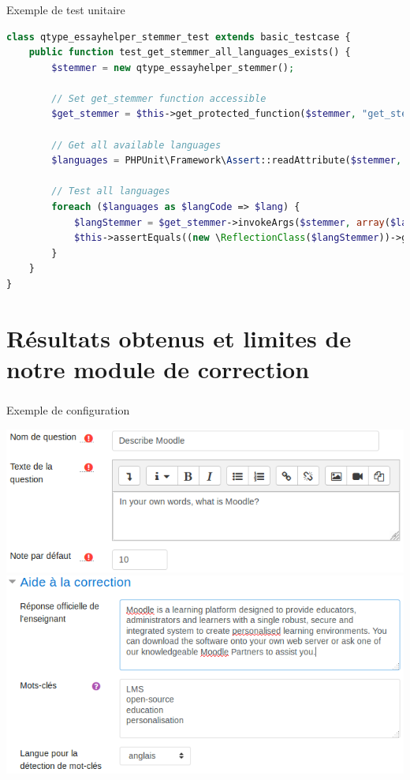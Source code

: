 \documentclass{beamer}
\begin{document}
  \begin{frame}[fragile]
    \frametitle{\insertsection}
    \alert{Exemple de test unitaire}
    \vfill
\begin{lstlisting}[language=php,frame=l,style=default]
class qtype_essayhelper_stemmer_test extends basic_testcase {
    public function test_get_stemmer_all_languages_exists() {
        $stemmer = new qtype_essayhelper_stemmer();

        // Set get_stemmer function accessible
        $get_stemmer = $this->get_protected_function($stemmer, "get_stemmer");

        // Get all available languages
        $languages = PHPUnit\Framework\Assert::readAttribute($stemmer, "languages");

        // Test all languages
        foreach ($languages as $langCode => $lang) {
            $langStemmer = $get_stemmer->invokeArgs($stemmer, array($langCode));
            $this->assertEquals((new \ReflectionClass($langStemmer))->getShortName(), $lang);
        }
    }
}
\end{lstlisting}
\end{frame}
  
  \section[R\'esultats]{R\'esultats obtenus et limites de notre module de correction}
  \begin{frame}
  \frametitle{\insertsection}
  \alert{Exemple de configuration}
  \vfill

    \hspace*{-0.9cm}\includegraphics[scale=0.4]{../images/questionform_base.png}
    \includegraphics[scale=0.4]{../images/questionform_helper.png}
  \end{frame}
  
\end{document}
